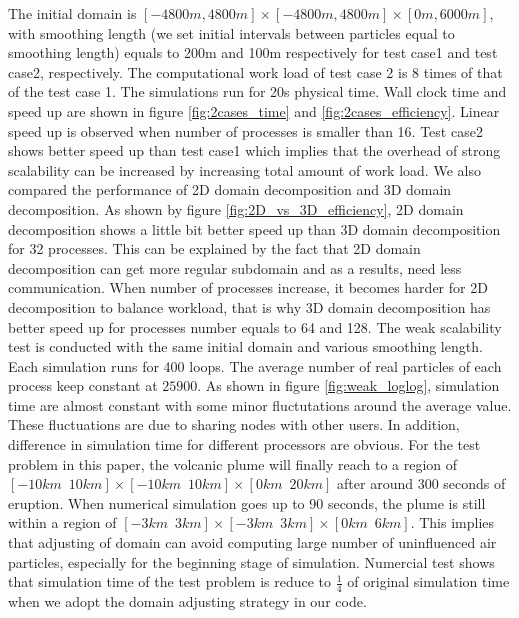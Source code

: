 \documentclass[conference,compsoc]{IEEEtran}
\begin{document}
%
The initial domain is $[-4800m,4800m]\times [-4800m,4800m] \times [0m, 6000m]$, with smoothing length (we set initial intervals between particles equal to smoothing length) equals to 200m and 100m respectively for test case1 and test case2, respectively. The computational work load of test case 2 is 8 times of that of the test case 1. The simulations run for 20s physical time.  Wall clock time and speed up are shown in figure \ref{fig:2cases_time} and \ref{fig:2cases_efficiency}. Linear speed up is observed when number of processes is smaller than 16. Test case2 shows better speed up than test case1 which implies that the overhead of strong scalability can be increased by increasing total amount of work load. We also compared the performance of 2D domain decomposition and 3D domain decomposition. As shown by figure \ref{fig:2D_vs_3D_efficiency}, 2D domain decomposition shows a little bit better speed up than 3D domain decomposition for 32 processes. This can be explained by the fact that 2D domain decomposition can get more regular subdomain and as a results, need less communication. When number of processes increase, it becomes harder for 2D decomposition to balance workload, that is why 3D domain decomposition has better speed up for processes number equals to 64 and 128. The weak scalability test is conducted with the same initial domain and various smoothing length. Each simulation runs for 400 loops. The average number of real particles of each process keep constant at $25900$. As shown in figure \ref{fig:weak_loglog}, simulation time are almost constant with some minor fluctutations around the average value. These fluctuations are due to sharing nodes with other users. In addition, difference in simulation time for different processors are obvious.
%
%
For the test problem in this paper, the volcanic plume will finally reach to a region of $[-10km \,\,\, 10km] \times [-10km\,\,\,10km] \times [0km\,\,\,20km]$ after around 300 seconds of eruption. When numerical simulation goes up to 90 seconds, the plume is still within a region of $[-3km\,\,\,3km] \times [-3km\,\,\,3km] \times [0km\,\,\,6km]$. This implies that adjusting of domain can avoid computing large number of uninfluenced air particles, especially for the beginning stage of simulation. Numercial test shows that simulation time of the test problem is reduce to $\frac{1}{4}$ of original simulation time when we adopt the domain adjusting strategy in our code. 
\end{document}

